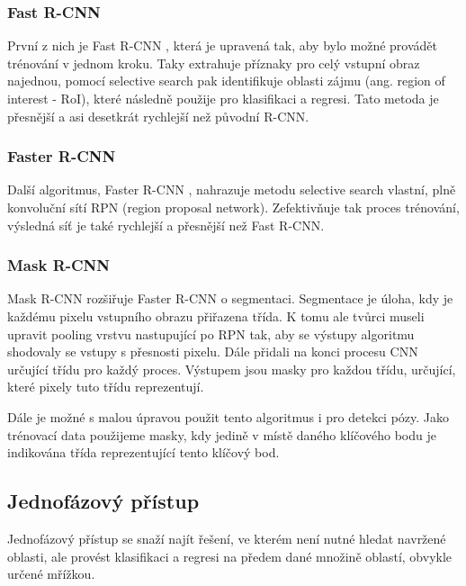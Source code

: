 \subsubsection{Fast R-CNN}
První z nich je Fast R-CNN \cite{fast-r-cnn}, která je upravená tak, aby bylo
možné provádět trénování v jednom kroku. Taky extrahuje příznaky pro celý
vstupní obraz najednou, pomocí selective search pak identifikuje oblasti zájmu
(ang. region of interest - RoI), které následně použije pro klasifikaci a
regresi. Tato metoda je přesnější a asi desetkrát rychlejší než původní R-CNN.

\subsubsection{Faster R-CNN}
Další algoritmus, Faster R-CNN \cite{faster-r-cnn}, nahrazuje metodu selective
search vlastní, plně konvoluční sítí RPN (region proposal network).
Zefektivňuje tak proces trénování, výsledná síť je také rychlejší a přesnější
než Fast R-CNN.

\subsubsection{Mask R-CNN}
Mask R-CNN \cite{mask-r-cnn} rozšiřuje Faster R-CNN o segmentaci. Segmentace je
úloha, kdy je každému pixelu vstupního obrazu přiřazena třída. K tomu ale
tvůrci museli upravit pooling vrstvu nastupující po RPN tak, aby se výstupy
algoritmu shodovaly se vstupy s přesnosti pixelu. Dále přidali na konci procesu
CNN určující třídu pro každý proces. Výstupem jsou masky pro každou třídu,
určující, které pixely tuto třídu reprezentují.

Dále je možné s malou úpravou použit tento algoritmus i pro detekci pózy. Jako
trénovací data použijeme masky, kdy jedině v místě daného klíčového bodu je
indikována třída reprezentující tento klíčový bod.


\subsection{Jednofázový přístup}

Jednofázový přístup se snaží najít řešení, ve kterém není nutné hledat navržené
oblasti, ale provést klasifikaci a regresi na předem dané množině oblastí,
obvykle určené mřížkou.

